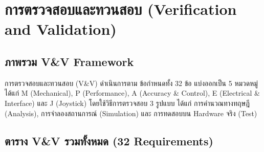 \section{การตรวจสอบและทวนสอบ (Verification and Validation)}
\label{sec:verification_and_validation}

\subsection{ภาพรวม V\&V Framework}
\label{subsec:vv_framework_overview}

การตรวจสอบและทวนสอบ (V\&V) ดำเนินการตาม
ข้อกำหนดทั้ง 32 ข้อ แบ่งออกเป็น 5 หมวดหมู่
ได้แก่ M (Mechanical), P (Performance),
A (Accuracy \& Control), E (Electrical \& Interface)
และ J (Joystick) โดยใช้วิธีการตรวจสอบ 3 รูปแบบ ได้แก่
การคำนวณทางทฤษฎี (Analysis),
การจำลองสถานการณ์ (Simulation) และ
การทดสอบบน Hardware จริง (Test)

\subsection{ตาราง V\&V รวมทั้งหมด (32 Requirements)}
\label{subsec:vv_table}

